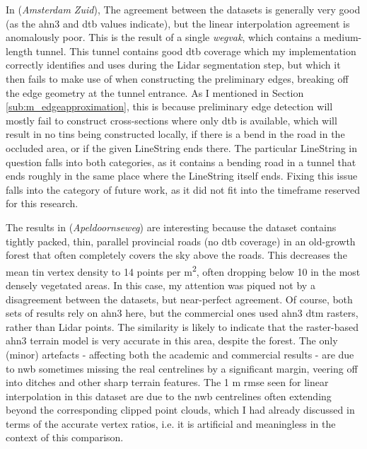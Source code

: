 In  (\textit{Amsterdam Zuid}), The agreement between the datasets is generally very good (as the \ac{ahn3} and \ac{dtb} values indicate), but the linear interpolation agreement is anomalously poor. This is the result of a single \textit{wegvak}, which contains a medium-length tunnel. This tunnel contains good \ac{dtb} coverage which my implementation correctly identifies and uses during the Lidar segmentation step, but which it then fails to make use of when constructing the preliminary edges, breaking off the edge geometry at the tunnel entrance. As I mentioned in Section \ref{sub:m_edgeapproximation}, this is because preliminary edge detection will mostly fail to construct cross-sections where only \ac{dtb} is available, which will result in no \ac{tin}s being constructed locally, if there is a bend in the road in the occluded area, or if the given LineString ends there. The particular LineString in question falls into both categories, as it contains a bending road in a tunnel that ends roughly in the same place where the LineString itself ends. Fixing this issue falls into the category of future work, as it did not fit into the timeframe reserved for this research.

The results in  (\textit{Apeldoornseweg}) are interesting because the dataset contains tightly packed, thin, parallel provincial roads (no \ac{dtb} coverage) in an old-growth forest that often completely covers the sky above the roads. This decreases the mean \ac{tin} vertex density to 14 points per m\textsuperscript{2}, often dropping below 10 in the most densely vegetated areas. In this case, my attention was piqued not by a disagreement between the datasets, but near-perfect agreement. Of course, both sets of results rely on \ac{ahn3} here, but the commercial ones used \ac{ahn3} \ac{dtm} rasters, rather than Lidar points. The similarity is likely to indicate that the raster-based \ac{ahn3} terrain model is very accurate in this area, despite the forest. The only (minor) artefacts - affecting both the academic and commercial results - are due to \ac{nwb} sometimes missing the real centrelines by a significant margin, veering off into ditches and other sharp terrain features. The 1 m \ac{rmse} seen for linear interpolation in this dataset are due to the \ac{nwb} centrelines often extending beyond the corresponding clipped point clouds, which I had already discussed in terms of the accurate vertex ratios, i.e. it is artificial and meaningless in the context of this comparison.

